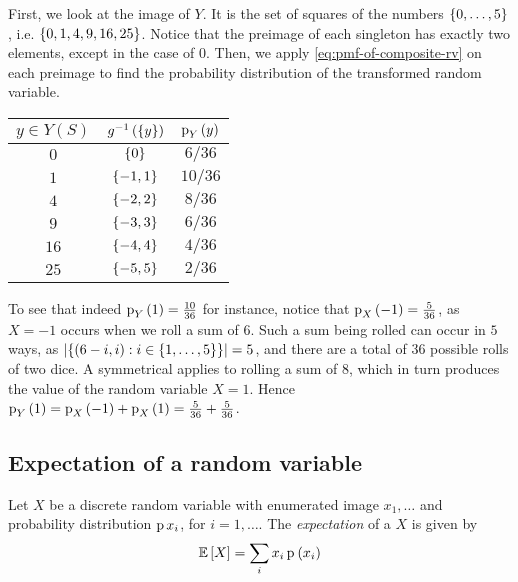 \documentclass[11pt]{article}
\begin{document}
\begin{solution}
    First, we look at the image of $Y$.
    It is the set of squares of the numbers $\range[0]{5}$,
    i.e.  $\left\{0, 1, 4, 9, 16, 25\right\}$.
    Notice that the preimage of each singleton has exactly two elements, except
    in the case of $0$. Then, we apply \eqref{eq:pmf-of-composite-rv} on each
    preimage to find the probability distribution of the transformed random
    variable.

    \begin{center}
        \begin{tabular}{c c c}
            $y \in Y(S)$ & $g^{-1}\left(\left\{y\right\}\right)$ & $\p[Y]{y}$\\ \hline
            $0$          & $\left\{0\right\}$     & $6/36$ \\
            $1$          & $\left\{-1,1\right\}$  & $10/36$ \\
            $4$          & $\left\{-2,2\right\}$  & $8/36$ \\
            $9$          & $\left\{-3,3\right\}$  & $6/36$ \\
            $16$         & $\left\{-4,4\right\}$  & $4/36$ \\
            $25$         & $\left\{-5,5\right\}$  & $2/36$
        \end{tabular}
    \end{center}

    To see that indeed $\p[Y]{1} = \frac{10}{36}$ for instance,
    notice that $\p[X]{-1} = \frac{5}{36}$, as $X = -1$ occurs when we roll a
    sum of $6$.
    Such a sum being rolled can occur in $5$ ways,
    as $\abs{\setof{(6 - i, i) : i \in \range{5}}} = 5$,
    and there are a total of $36$ possible rolls of two dice.
    A symmetrical applies to rolling a sum of $8$, which in turn produces the
    value of the random variable $X = 1$.
    Hence $\p[Y]{1} = \p[X]{-1} + \p[X]{1} = \frac{5}{36} + \frac{5}{36}$.
\end{solution}

\subsection{Expectation of a random variable}

\begin{defn}
    \label{def:expectation}
    Let $X$ be a discrete random variable with enumerated image $x_1, \ldots$
    and probability distribution $\operatorname{p}{x_i}$, for $i = 1,\ldots$.
    The \emph{expectation} of a $X$ is given by
    \begin{equation*}
        \E{X} = \sum_i x_i \p{x_i}
    \end{equation*}
\end{defn}
\end{document}
